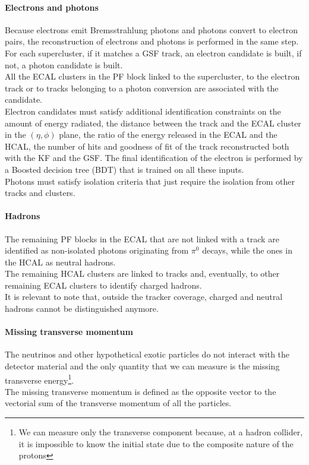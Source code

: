 \paragraph*{Electrons and photons}
Because electrons emit Bremsstrahlung photons and photons convert to electron pairs, the reconstruction of electrons and photons is performed in the same step.\\
For each supercluster, if it matches a GSF track, an electron candidate is built, if not, a photon candidate is built. \\
All the ECAL clusters in the PF block linked to the supercluster, to the electron track or to tracks belonging to a photon conversion are associated with the candidate.\\
Electron candidates must satisfy additional identification constraints on the amount of energy radiated, the distance between the track and the ECAL cluster in the $(\eta,\phi)$ plane, the ratio of the energy released in the ECAL and the HCAL, the number of hits and goodness of fit of the track reconstructed both with the KF and the GSF. The final identification of the electron is performed by a Boosted decision tree (BDT) that is trained on all these inputs.\\
Photons must satisfy isolation criteria that just require the isolation from other tracks and clusters.

\paragraph*{Hadrons}
The remaining PF blocks in the ECAL that are not linked with a track are identified as non-isolated photons originating from $\pi^0$ decays, while the ones in the HCAL as neutral hadrons.\\
The remaining HCAL clusters are linked to tracks and, eventually, to other remaining ECAL clusters to identify charged hadrons.\\
It is relevant to note that, outside the tracker coverage, charged and neutral hadrons cannot be distinguished anymore.

\paragraph*{Missing transverse momentum}
The neutrinos and other hypothetical exotic particles do not interact with the detector material and the only quantity that we can measure is the missing transverse energy\footnote{We can measure only the transverse component because, at a hadron collider, it is impossible to know the initial state due to the composite nature of the protons}.\\
The missing transverse momentum is defined as the opposite vector to the vectorial sum of the transverse momentum of all the particles.

